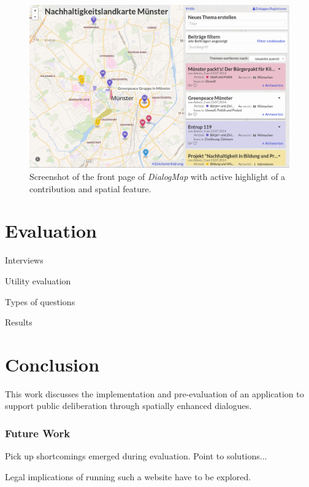 \documentclass{sigchi}
\begin{document}
\begin{figure}[!h]
    \centering
    \includegraphics[width=0.9\columnwidth]{screenshot}
    \caption{Screenshot of the front page of \textit{DialogMap} with active highlight of a contribution and spatial feature.}
    \label{fig:screenshot}
\end{figure}


\section{Evaluation}

Interviews

Utility evaluation

Types of questions

Results

\section{Conclusion}

This work discusses the implementation and pre-evaluation of an application to support public deliberation through spatially enhanced dialogues.

\subsubsection{Future Work}
Pick up shortcomings emerged during evaluation. Point to solutions...

Legal implications of running such a website have to be explored.


\end{document}
